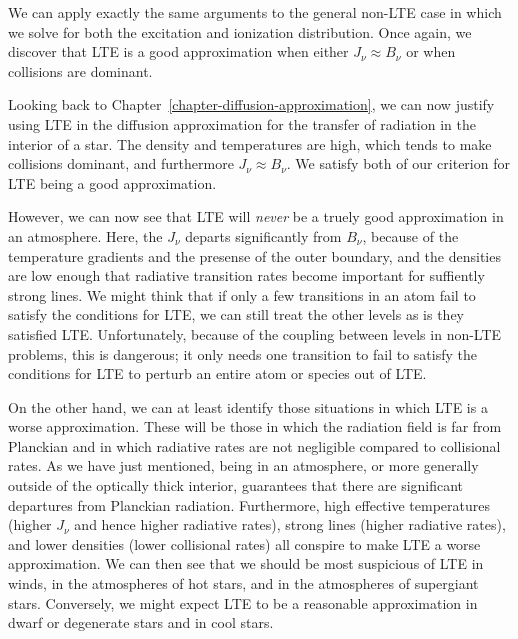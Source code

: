 We can apply exactly the same arguments to the general non-LTE case in
which we solve for both the excitation and ionization distribution. Once
again, we discover that LTE is a good approximation when either $J_\nu
\approx B_\nu$ or when collisions are dominant.

Looking back to Chapter~\ref{chapter-diffusion-approximation}, we can
now justify using LTE in the diffusion approximation for the transfer of
radiation in the interior of a star. The density and temperatures are
high, which tends to make collisions dominant, and furthermore $J_\nu
\approx B_\nu$. We satisfy both of our criterion for LTE being a good
approximation.

However, we can now see that LTE will \emph{never} be a truely good
approximation in an atmosphere. Here, the $J_\nu$ departs significantly
from $B_\nu$, because of the temperature gradients and the presense of
the outer boundary, and the densities are low enough that radiative
transition rates become important for suffiently strong lines. We might
think that if only a few transitions in an atom fail to satisfy the
conditions for LTE, we can still treat the other levels as is they
satisfied LTE. Unfortunately, because of the coupling between levels in
non-LTE problems, this is dangerous; it only needs one transition to
fail to satisfy the conditions for LTE to perturb an entire atom or
species out of LTE.

On the other hand, we can at least identify those situations in which
LTE is a worse approximation. These will be those in which the radiation
field is far from Planckian and in which radiative rates are not
negligible compared to collisional rates. As we have just mentioned,
being in an atmosphere, or more generally outside of the optically thick
interior, guarantees that there are significant departures from
Planckian radiation. Furthermore, high effective temperatures (higher
$J_\nu$ and hence higher radiative rates), strong lines (higher
radiative rates), and lower densities (lower collisional rates) all
conspire to make LTE a worse approximation. We can then see that we
should be most suspicious of LTE in winds, in the atmospheres of hot
stars, and in the atmospheres of supergiant stars. Conversely, we might
expect LTE to be a reasonable approximation in dwarf or degenerate stars
and in cool stars.


